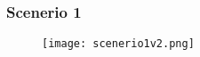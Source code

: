 \documentclass{beamer}\usepackage[]{graphicx}\usepackage[]{color}
\begin{document}
\begin{frame}
\frametitle{Scenerio 1}
\begin{figure}
  \texttt{[image: scenerio1v2.png]}
\end{figure}

\end{frame}
% 
\end{document}
